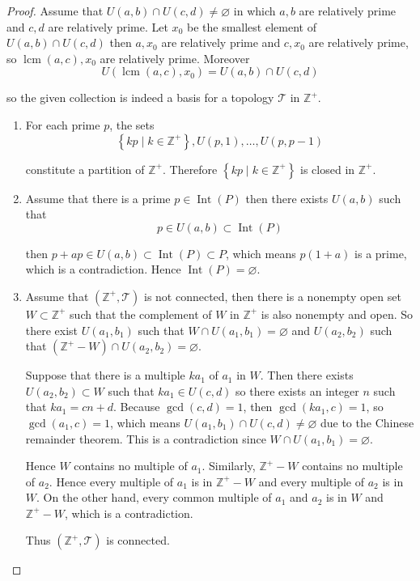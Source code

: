 \begin{proof}
	Assume that \( U(a, b) \cap U(c, d) \ne \varnothing \) in which \( a, b \)  are relatively prime and \( c, d \) are relatively prime. Let \( x_{0} \) be the smallest element of \( U(a, b) \cap U(c, d) \) then \( a, x_{0} \) are relatively prime and \( c, x_{0} \) are relatively prime, so \( \operatorname{lcm}(a, c), x_{0} \) are relatively prime. Moreover
	\[
		U(\operatorname{lcm}(a, c), x_{0}) = U(a, b) \cap U(c, d)
	\]

	so the given collection is indeed a basis for a topology \( \mathscr{T} \) in \( \mathbb{Z}^{+} \).

	\begin{enumerate}[label={(\alph*)}]
		\item For each prime \(p\), the sets
		      \[
			      \left\{ kp \mid k \in \mathbb{Z}^{+} \right\}, U(p, 1), \ldots, U(p, p - 1)
		      \]

		      constitute a partition of \( \mathbb{Z}^{+} \). Therefore \( \left\{ kp \mid k \in \mathbb{Z}^{+} \right\} \) is closed in \( \mathbb{Z}^{+} \).
		\item Assume that there is a prime \( p \in \operatorname{Int}(P) \) then there exists \( U(a, b) \) such that
		      \[
			      p \in U(a, b) \subset \operatorname{Int}(P)
		      \]

		      then \( p + ap \in U(a, b) \subset \operatorname{Int}(P) \subset P \), which means \( p(1 + a) \) is a prime, which is a contradiction. Hence \( \operatorname{Int}(P) = \varnothing \).
		\item Assume that \( (\mathbb{Z}^{+}, \mathscr{T}) \) is not connected, then there is a nonempty open set \( W \subset \mathbb{Z}^{+} \) such that the complement of \( W \) in \( \mathbb{Z}^{+} \) is also nonempty and open. So there exist \( U(a_{1}, b_{1}) \) such that \( W \cap U(a_{1}, b_{1}) = \varnothing \) and \( U(a_{2}, b_{2}) \) such that \( (\mathbb{Z}^{+} - W) \cap U(a_{2}, b_{2}) = \varnothing \).

		      Suppose that there is a multiple \( ka_{1} \) of \( a_{1} \) in \( W \). Then there exists \( U(a_{2}, b_{2}) \subset W \) such that \( ka_{1} \in U(c, d) \) so there exists an integer \( n \) such that \( ka_{1} = cn + d \). Because \( \gcd(c, d) = 1 \), then \( \gcd(ka_{1}, c) = 1 \), so \( \gcd(a_{1}, c) = 1 \), which means \( U(a_{1}, b_{1}) \cap U(c, d) \ne \varnothing \) due to the Chinese remainder theorem. This is a contradiction since \( W \cap U(a_{1}, b_{1}) = \varnothing \).

		      Hence \( W \) contains no multiple of \( a_{1} \). Similarly, \( \mathbb{Z}^{+} - W \) contains no multiple of \( a_{2} \). Hence every multiple of \( a_{1} \) is in \( \mathbb{Z}^{+} - W \) and every multiple of \( a_{2} \) is in \( W \). On the other hand, every common multiple of \( a_{1} \) and \( a_{2} \) is in \( W \) and \( \mathbb{Z}^{+} - W \), which is a contradiction.

		      Thus \( (\mathbb{Z}^{+}, \mathscr{T}) \) is connected.
	\end{enumerate}
\end{proof}

